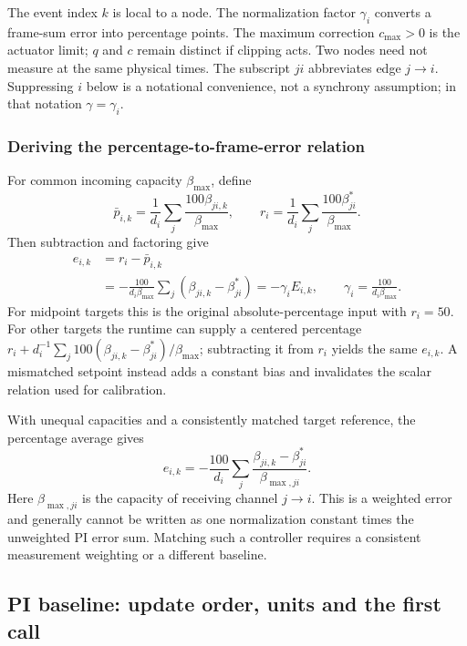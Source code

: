 The event index $k$ is local to a node. The normalization factor $\gamma_i$ converts a frame-sum error into percentage points. The maximum correction $c_{\max}>0$ is the actuator limit; $q$ and $c$ remain distinct if clipping acts. Two nodes need not measure at the
same physical times. The subscript $ji$ abbreviates edge $j\to i$.
Suppressing $i$ below is a notational convenience, not a synchrony
assumption; in that notation $\gamma=\gamma_i$.

\subsubsection{Deriving the percentage-to-frame-error relation}
For common incoming capacity $\beta_{\max}$, define
\[
 \bar p_{i,k}=\frac1{d_i}\sum_j\frac{100\beta_{ji,k}}{\beta_{\max}},\qquad
 r_i=\frac1{d_i}\sum_j\frac{100\beta^*_{ji}}{\beta_{\max}}.
\]
Then subtraction and factoring give
\begin{align}
 e_{i,k}&=r_i-\bar p_{i,k}\\
 &=-\frac{100}{d_i\beta_{\max}}\sum_j(\beta_{ji,k}-\beta^*_{ji})
 =-\gamma_i E_{i,k},\qquad \gamma_i=\frac{100}{d_i\beta_{\max}}.
 \label{detail:eq:fpi_percent}
\end{align}
For midpoint targets this is the original absolute-percentage input with
$r_i=50$. For other targets the runtime can supply a centered percentage
$r_i+d_i^{-1}\sum_j100(\beta_{ji,k}-\beta^*_{ji})/\beta_{\max}$; subtracting it from
$r_i$ yields the same $e_{i,k}$. A mismatched setpoint instead adds a
constant bias and invalidates the scalar relation used for calibration.

With unequal capacities and a consistently matched target reference, the
percentage average gives
\[
 e_{i,k}=-\frac{100}{d_i}\sum_j
 \frac{\beta_{ji,k}-\beta^*_{ji}}{\beta_{\max,ji}}.
\]
Here $\beta_{\max,ji}$ is the capacity of receiving channel $j\to i$.
This is a weighted error and generally cannot be written as one normalization constant
times the unweighted PI error sum. Matching such a controller requires a
consistent measurement weighting or a different baseline.

\subsection{PI baseline: update order, units and the first call}

